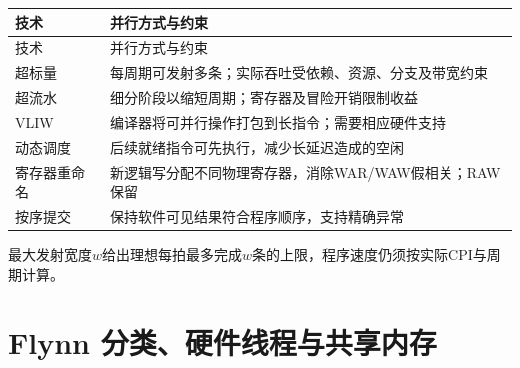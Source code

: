 \par\smallskip
{\fontsize{9.3}{12}\selectfont\setlength{\tabcolsep}{2.5pt}\setlength{\LTleft}{0pt}\setlength{\LTright}{0pt}
\begin{longtable}{@{}>{\raggedright\arraybackslash}p{}>{\raggedright\arraybackslash}p{}@{}}
\toprule
技术 & 并行方式与约束 \\

\midrule\endfirsthead\toprule
技术 & 并行方式与约束 \\

\midrule\endhead\bottomrule\endfoot
超标量 & 每周期可发射多条；实际吞吐受依赖、资源、分支及带宽约束 \\

超流水 & 细分阶段以缩短周期；寄存器及冒险开销限制收益 \\

VLIW & 编译器将可并行操作打包到长指令；需要相应硬件支持 \\

动态调度 & 后续就绪指令可先执行，减少长延迟造成的空闲 \\

寄存器重命名 & 新逻辑写分配不同物理寄存器，消除WAR/WAW假相关；RAW保留 \\

按序提交 & 保持软件可见结果符合程序顺序，支持精确异常 \\

\end{longtable}}
\par\smallskip

最大发射宽度\(w\)给出理想每拍最多完成\(w\)条的上限，程序速度仍须按实际CPI与周期计算。

\section{Flynn 分类、硬件线程与共享内存}\label{CO05-threads}

